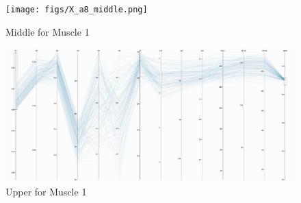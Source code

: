 \begin{figure}[ht]
   \begin{center}
    \texttt{[image: figs/X\_a8\_middle.png]}
  \end{center}
  \caption{Middle for Muscle 1}
  \label{fig_mid}
\end{figure}

\begin{figure}[ht]
   \begin{center}
    \includegraphics[width=1.0\textwidth]{figs/X_a8_upper.png}
  \end{center}
  \caption{Upper for Muscle 1}
  \label{fig_high}
\end{figure}